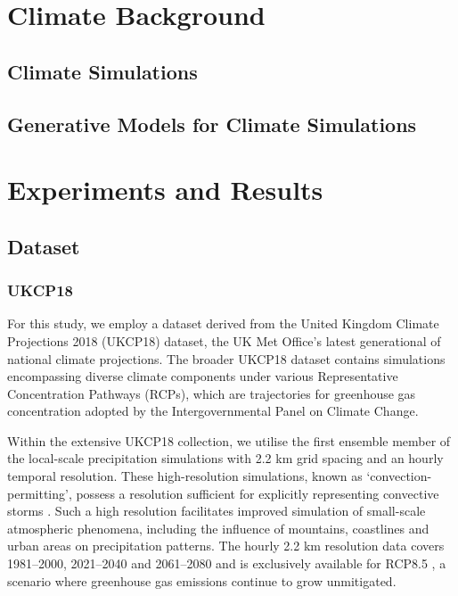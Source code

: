\documentclass[ oneside,%
                    author={George Herbert},
                    degree={MSci},
                     title={Video Diffusion Models for Climate Simulations},
                  subtitle={}]{dissertation}
\begin{document}
\chapter{Climate Background}
\label{chap:background_climate}

\section{Climate Simulations}
\label{sec:background_climate_simulations}

\section{Generative Models for Climate Simulations}
\label{sec:background_climate_generative}


\chapter{Experiments and Results}
\label{chap:results}

\section{Dataset}
\label{sec:results_dataset}

\subsection{UKCP18}
\label{sec:results_dataset_ukcp18}

For this study, we employ a dataset derived from the United Kingdom Climate Projections 2018 (UKCP18) \cite{MO_UKCP18_Dataset} dataset, the UK Met Office's latest generational of national climate projections. The broader UKCP18 dataset contains simulations encompassing diverse climate components under various Representative Concentration Pathways (RCPs), which are trajectories for greenhouse gas concentration adopted by the Intergovernmental Panel on Climate Change.

Within the extensive UKCP18 collection, we utilise the first ensemble member of the local-scale precipitation simulations with 2.2 km grid spacing and an hourly temporal resolution. These high-resolution simulations, known as `convection-permitting', possess a resolution sufficient for explicitly representing convective storms \cite{MO_CPM}. Such a high resolution facilitates improved simulation of small-scale atmospheric phenomena, including the influence of mountains, coastlines and urban areas on precipitation patterns. The hourly 2.2 km resolution data covers 1981--2000, 2021--2040 and 2061--2080 and is exclusively available for RCP8.5 \cite{MO_RCP_Guidance}, a scenario where greenhouse gas emissions continue to grow unmitigated.
\end{document}
